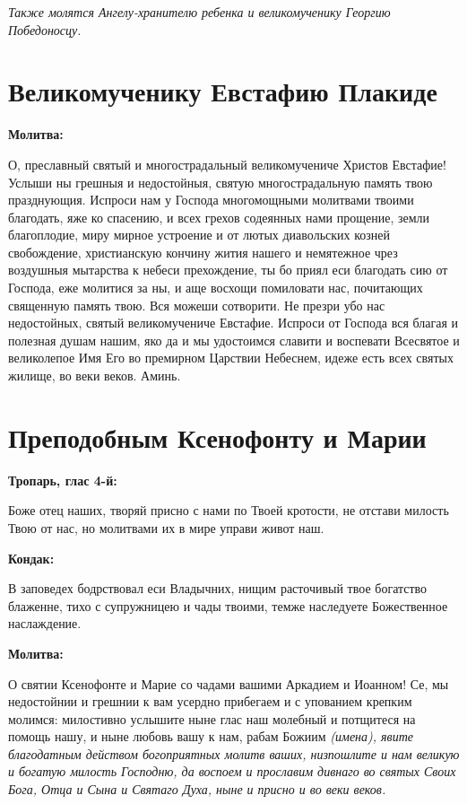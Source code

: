 \itshape Также молятся Ангелу-хранителю ребенка и великомученику Георгию Победоносцу.

\normalfont{} 


\section{Великомученику Евстафию Плакиде}
 

\bfseries Молитва:\normalfont{}


О, преславный святый и многострадальный великомучениче Христов Евстафие! Услыши ны грешныя и недостойныя, святую многострадальную память твою празднующия. Испроси нам у Господа многомощными молитвами твоими благодать, яже ко спасению, и всех грехов содеянных нами прощение, земли благоплодие, миру мирное устроение и от лютых диавольских козней свобождение, христианскую кончину жития нашего и немятежное чрез воздушныя мытарства к небеси прехождение, ты бо приял еси благодать сию от Господа, еже молитися за ны, и аще восхощи помиловати нас, почитающих священную память твою. Вся можеши сотворити. Не презри убо нас недостойных, святый великомучениче Евстафие. Испроси от Господа вся благая и полезная душам нашим, яко да и мы удостоимся славити и воспевати Всесвятое и великолепое Имя Его во премирном Царствии Небеснем, идеже есть всех святых жилище, во веки веков. Аминь. 


\section{Преподобным Ксенофонту и Марии}
 
\bfseries Тропарь, глас 4-й:\normalfont{}


Боже отец наших, творяй присно с нами по Твоей кротости, не отстави милость Твою от нас, но молитвами их в мире управи живот наш.


\medskip
\bfseries Кондак:\normalfont{}


В заповедех бодрствовал еси Владычних, нищим расточивый твое богатство блаженне, тихо с супружницею и чады твоими, темже наследуете Божественное наслаждение.


\medskip
\bfseries Молитва:\normalfont{}


О святии Ксенофонте и Марие со чадами вашими Аркадием и Иоанном! Се, мы недостойнии и грешнии к вам усердно прибегаем и с упованием крепким молимся: милостивно услышите ныне глас наш молебный и потщитеся на помощь нашу, и ныне любовь вашу к нам, рабам Божиим \itshape (имена)\normalfont{}, явите благодатным действом богоприятных молитв ваших, низпошлите и нам великую и богатую милость Господню, да воспоем и прославим дивнаго во святых Своих Бога, Отца и Сына и Святаго Духа, ныне и присно и во веки веков.

